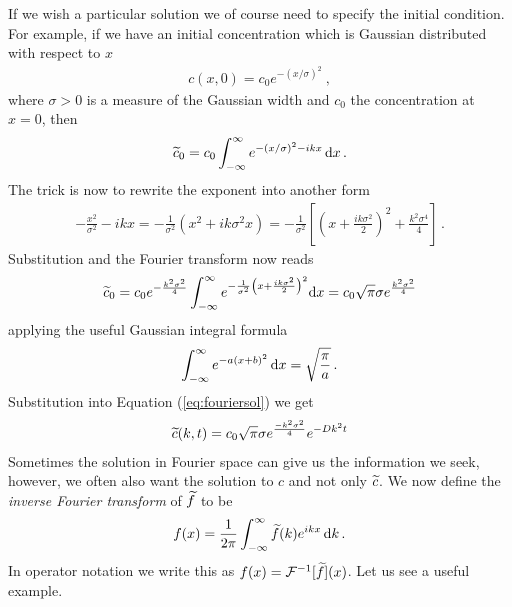 If we wish a particular solution we of course need to specify the initial condition. For example, if we have an initial concentration 
which is Gaussian distributed with respect to $x$ 
\begin{eqnarray}
	\label{eq:initRealUnbounded}
	c(x, 0) = c_0 e^{-(x/\sigma)^2} \ , 
\end{eqnarray}
where $\sigma > 0$ is a measure of the Gaussian width and $c_0$ the concentration at $x=0$, then 
\begin{eqnarray}
	\widetilde{c}_0 = c_0 \int_{-\infty}^\infty e^{-(x/\sigma)^2 - ikx} \, \mathrm{d} x \, .
\end{eqnarray}
The trick is now to rewrite the exponent into another form
\begin{eqnarray}
	-\frac{x^2}{\sigma^2} - ikx  = -\frac{1}{\sigma^2} \left(x^2 + ik\sigma^2x \right)=  -\frac{1}{\sigma^2} 
	\left[ \left(x + \frac{ik\sigma^2}{2} \right)^2 + \frac{k^2\sigma^4}{4} \right] \, .
\end{eqnarray}
Substitution and the Fourier transform now reads
\begin{eqnarray}
	\widetilde{c}_0 = c_0 e^{-\frac{k^2\sigma^2}{4}} \int_{-\infty}^\infty e^{-\frac{1}{\sigma^2}\left(x + \frac{ik\sigma^2}{2} \right)^2} \mathrm{d} x = 
	c_0 \sqrt{\pi} \sigma  e^{\frac{k^2\sigma^2}{4}} 
\end{eqnarray}
applying the useful Gaussian integral formula
\begin{eqnarray}
	\int_{-\infty}^\infty e^{-a(x+b)^2} \, \mathrm{d} x = \sqrt{\frac{\pi}{a}} \, .
\end{eqnarray}
Substitution into Equation (\ref{eq:fouriersol}) we get 
\begin{eqnarray}
	\label{eq:fouriersolc}
	\widetilde{c}(k,t)=c_0 \sqrt{\pi} \sigma  e^{\frac{-k^2\sigma^2}{4}}   e^{-Dk^2t}
\end{eqnarray}
Sometimes the solution in Fourier space can give us the information we seek, however, we often also want 
the solution to $c$ and not only $\widetilde{c}$. We now define the \emph{inverse Fourier transform} of $\widetilde{f}$ 
to be 
\begin{eqnarray}
	f(x) = \frac{1}{2\pi} \int_{-\infty}^\infty \widetilde{f}(k) e^{ikx} \, \mathrm{d} k \, .
\end{eqnarray}
In operator notation we write this as $f(x) = \mathcal{F}^{-1}[\widetilde{f}](x)$. 
Let us see a useful example. 
